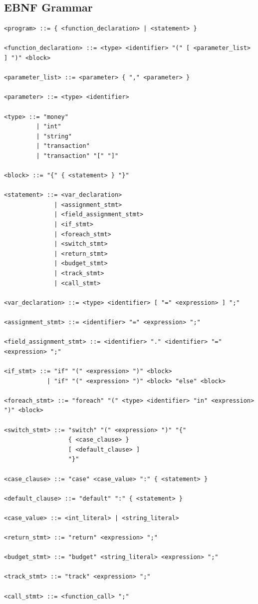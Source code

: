 \documentclass[11pt]{article}
\begin{document}
\subsection*{EBNF Grammar}
\begin{verbatim}
<program> ::= { <function_declaration> | <statement> }

<function_declaration> ::= <type> <identifier> "(" [ <parameter_list> ] ")" <block>

<parameter_list> ::= <parameter> { "," <parameter> }

<parameter> ::= <type> <identifier>

<type> ::= "money"
         | "int"
         | "string"
         | "transaction"
         | "transaction" "[" "]"

<block> ::= "{" { <statement> } "}"

<statement> ::= <var_declaration>
              | <assignment_stmt>
              | <field_assignment_stmt>
              | <if_stmt>
              | <foreach_stmt>
              | <switch_stmt>
              | <return_stmt>
              | <budget_stmt>
              | <track_stmt>
              | <call_stmt>

<var_declaration> ::= <type> <identifier> [ "=" <expression> ] ";"

<assignment_stmt> ::= <identifier> "=" <expression> ";"

<field_assignment_stmt> ::= <identifier> "." <identifier> "=" <expression> ";"

<if_stmt> ::= "if" "(" <expression> ")" <block>
            | "if" "(" <expression> ")" <block> "else" <block>

<foreach_stmt> ::= "foreach" "(" <type> <identifier> "in" <expression> ")" <block>

<switch_stmt> ::= "switch" "(" <expression> ")" "{"
                  { <case_clause> }
                  [ <default_clause> ]
                  "}"

<case_clause> ::= "case" <case_value> ":" { <statement> }

<default_clause> ::= "default" ":" { <statement> }

<case_value> ::= <int_literal> | <string_literal>

<return_stmt> ::= "return" <expression> ";"

<budget_stmt> ::= "budget" <string_literal> <expression> ";"

<track_stmt> ::= "track" <expression> ";"

<call_stmt> ::= <function_call> ";"


\end{verbatim}
\end{document}
